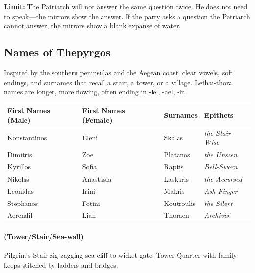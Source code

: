 \textbf{Limit:} The Patriarch will not answer the same question twice. He does not need to speak---the mirrors show the answer. If the party asks a question the Patriarch cannot answer, the mirrors show a blank expanse of water.

\subsection*{Names of Thepyrgos}
\label{sec:thepyrgos-names}

Inspired by the southern peninsulas and the Aegean coast: clear vowels, soft endings, and surnames that recall a stair, a tower, or a village. Lethai-thora names are longer, more flowing, often ending in -iel, -ael, -ir.

\begin{longtable}{|p{}|p{}|p{}|p{}|}
\hline
\textbf{First Names (Male)} & \textbf{First Names (Female)} & \textbf{Surnames} & \textbf{Epithets} \\
\hline
Konstantinos & Eleni & Skalas & \textit{the Stair-Wise} \\
\hline
Dimitris & Zoe & Platanos & \textit{the Unseen} \\
\hline
Kyrillos & Sofia & Raptis & \textit{Bell-Sworn} \\
\hline
Nikolas & Anastasia & Laskaris & \textit{the Accursed} \\
\hline
Leonidas & Irini & Makris & \textit{Ash-Finger} \\
\hline
Stephanos & Fotini & Koutroulis & \textit{the Silent} \\
\hline
Aerendil & Lian & Thoraen & \textit{Archivist} \\
\hline
\end{longtable}

\paragraph*{(Tower/Stair/Sea-wall)} Pilgrim's Stair zig-zagging sea-cliff to wicket gate; Tower Quarter with family keeps stitched by ladders and bridges.


